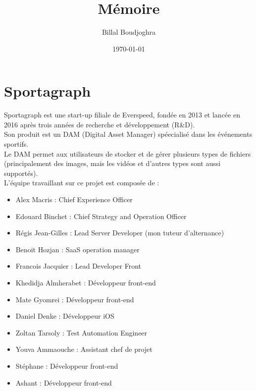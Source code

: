 \documentclass[11pt]{article}
\author{Billal Boudjoghra}
\date{\today}
\title{Mémoire}
\begin{document}
\maketitle
\tableofcontents

\newpage
\section{Sportagraph}
\label{sec:org7859fcd}
Sportagraph est une start-up filiale de Everspeed, fondée en 2013 et lancée en 2016 après trois années de recherche et développement (R\&D).\\
Son produit est un DAM (Digital Asset Manager) spéecialisé dans les événements sportifs.\\

Le DAM permet aux utilisateurs de stocker et de gérer plusieurs types de fichiers (principalement des images, mais les vidéos et d’autres types sont aussi supportés).\\
L’équipe travaillant sur ce projet est composée de :\\
\begin{itemize}
\item Alex Macris : Chief Experience Officer\\
\item Edouard Binchet : Chief Strategy and Operation Officer\\
\item Régis Jean-Gilles : Lead Server Developer (mon tuteur d'alternance)\\
\item Benoit Hozjan : SaaS operation manager\\
\item Francois Jacquier : Lead Developer Front\\
\item Khedidja Almherabet : Développeur front-end\\
\item Mate Gyomrei : Développeur front-end\\
\item Daniel Denke : Développeur iOS\\
\item Zoltan Tarsoly : Test Automation Engineer\\
\item Youva Ammaouche : Assistant chef de projet\\
\item Stéphane : Développeur front-end\\
\item Ashant : Développeur front-end\\
\end{itemize}
\end{document}
